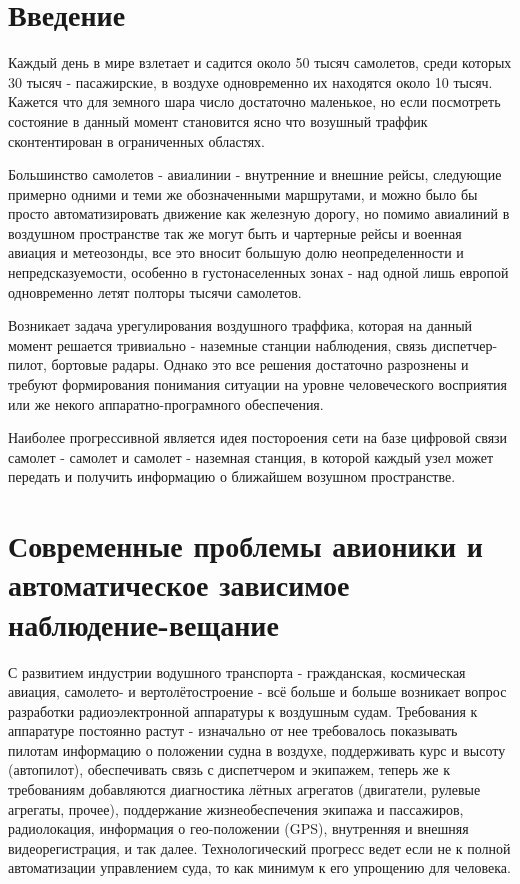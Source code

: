 \documentclass[a4paper,12pt]{report} %
\begin{document}
\tableofcontents

\setlength{\parskip}{1em}
\section{Введение} %

Каждый день в мире взлетает и садится около 50 тысяч самолетов, среди
которых 30 тысяч - пасажирские, в воздухе одновременно их находятся около 10
тысяч. Кажется что для земного шара число достаточно маленькое, но если
посмотреть состояние в данный момент становится ясно что возушный траффик
сконтентирован в ограниченных областях.

Большинство самолетов - авиалинии - внутренние и внешние рейсы, следующие
примерно одними и теми же обозначенными маршрутами, и можно было бы просто
автоматизировать движение как железную дорогу, но помимо авиалиний в воздушном
пространстве так же могут быть и чартерные рейсы и военная авиация и метеозонды,
все это вносит большую долю неопределенности и непредсказуемости, особенно в
густонаселенных зонах - над одной лишь европой одновременно летят полторы тысячи
самолетов.

Возникает задача урегулирования воздушного траффика, которая на данный момент
решается тривиально - наземные станции наблюдения, связь диспетчер-пилот,
бортовые радары. Однако это все решения достаточно разрознены и требуют
формирования понимания ситуации на уровне человеческого восприятия или же некого
аппаратно-програмного обеспечения.

Наиболее прогрессивной является идея постороения сети на базе цифровой связи
самолет - самолет и самолет - наземная станция, в которой каждый узел может
передать и получить информацию о ближайшем возушном пространстве.
\newpage
\section{Современные проблемы авионики и автоматическое зависимое
  наблюдение-вещание} %

С развитием индустрии водушного транспорта - гражданская, космическая авиация,
самолето- и вертолётостроение - всё больше и больше возникает вопрос разработки
радиоэлектронной аппаратуры к воздушным судам. Требования к аппаратуре постоянно
растут - изначально от нее требовалось показывать пилотам информацию о положении
судна в воздухе, поддерживать курс и высоту (автопилот), обеспечивать связь с
диспетчером и экипажем, теперь же к требованиям добавляются диагностика лётных
агрегатов (двигатели, рулевые агрегаты, прочее), поддержание жизнеобеспечения
экипажа и пассажиров, радиолокация, информация о гео-положении
(GPS), внутренняя и внешняя видеорегистрация, и так далее. Технологический
прогресс ведет если не к полной автоматизации управлением суда, то как минимум к
его упрощению для человека.
\end{document}
